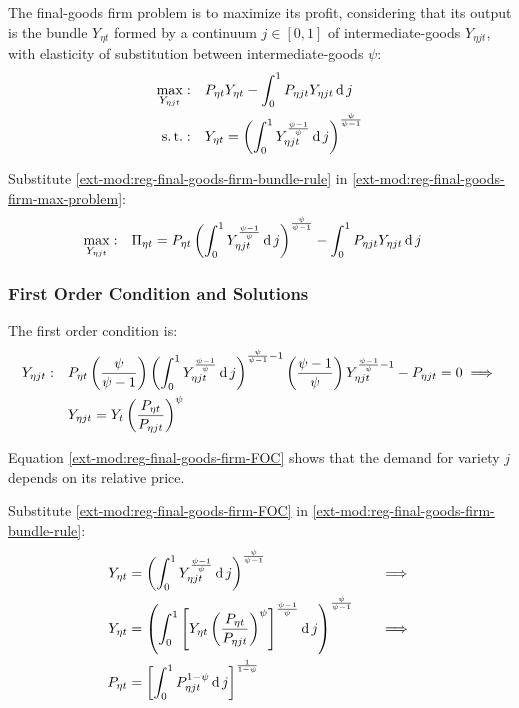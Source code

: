 \documentclass[../thesis.tex]{subfiles}
\begin{document}
The final-goods firm problem is to maximize its profit, considering that its output is the bundle $Y_{\eta t}$ formed by a continuum $j \in [0,1]$ of intermediate-goods $Y_{\eta jt}$, with elasticity of substitution between intermediate-goods $\psi$:
\begin{align}
	\max_{Y_{\eta jt}}: &\quad P_{\eta t} Y_{\eta t} - \int_{0}^{1} P_{\eta jt} Y_{\eta jt} \operatorname{d} j \label{ext-mod:reg-final-goods-firm-max-problem} \\
	\operatorname{s.t.}: & \quad Y_{\eta t} = \left( \int_{0}^{1} Y_{\eta jt}^{\frac{\psi-1}{\psi}} \operatorname{d} j \right)^{\frac{\psi}{\psi-1}} \label{ext-mod:reg-final-goods-firm-bundle-rule}
\end{align}

Substitute \ref{ext-mod:reg-final-goods-firm-bundle-rule} in \ref{ext-mod:reg-final-goods-firm-max-problem}:
\begin{align}
	\label{ext-mod:reg-final-goods-firm-max-problem-2}
	\max_{Y_{\eta jt}}: & \quad \Pi_{\eta t} = P_{\eta t} \left( \int_{0}^{1} Y_{\eta jt}^{\frac{\psi-1}{\psi}} \operatorname{d} j \right)^{\frac{\psi}{\psi-1}} - \int_{0}^{1} P_{\eta jt} Y_{\eta jt} \operatorname{d} j
\end{align}

\subsubsection*{First Order Condition and Solutions}

The first order condition is:
\begin{align}
	Y_{\eta jt}:\quad & P_{\eta t} \left( \frac{\psi}{\psi-1} \right) \left( \int_{0}^{1} Y_{\eta jt}^{\frac{\psi-1}{\psi}} \operatorname{d} j \right)^{\frac{\psi}{\psi-1}-1} \left( \frac{\psi-1}{\psi} \right) Y_{\eta jt}^{\frac{\psi-1}{\psi}-1} - P_{\eta jt} = 0 \implies \nonumber \\
	\label{ext-mod:reg-final-goods-firm-FOC}
	& Y_{\eta jt} = Y_{t} \left( \frac{P_{\eta t}}{P_{\eta jt}} \right)^{\psi}
\end{align}

Equation \ref{ext-mod:reg-final-goods-firm-FOC} shows that the demand for variety $j$ depends on its relative price. 

Substitute \ref{ext-mod:reg-final-goods-firm-FOC} in \ref{ext-mod:reg-final-goods-firm-bundle-rule}:
\begin{alignat}{2}
	Y_{\eta t} & = \left( \int_{0}^{1} Y_{\eta jt}^{\frac{\psi-1}{\psi}} \operatorname{d} j \right)^{\frac{\psi}{\psi-1}} &\implies \nonumber \\
	Y_{\eta t} & = \left( \int_{0}^{1} \left[ Y_{\eta t} \left( \frac{P_{\eta t}}{P_{\eta jt}} \right)^{\psi} \right]^{\frac{\psi-1}{\psi}} \operatorname{d} j \right)^{\frac{\psi}{\psi-1}} \quad &\implies \nonumber \\
	P_{\eta t} & = \left[ \int_{0}^{1} P_{\eta jt}^{1-\psi} \operatorname{d} j \right]^{\frac{1}{1-\psi}} \label{ext-mod:reg-final-goods-firm-markup}
\end{alignat}
\end{document}
